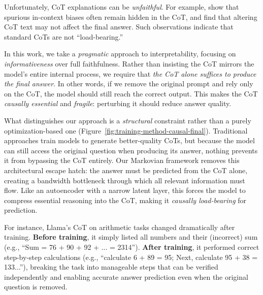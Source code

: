 \documentclass{article} %
\begin{document}
Unfortunately, CoT explanations can be \emph{unfaithful}. For example, \citet{turpin2023language} show that spurious in-context biases often remain hidden in the CoT, and \citet{lanham2023measuring} find that altering CoT text may not affect the final answer. Such observations indicate that standard CoTs are not ``load-bearing.''

In this work, we take a \emph{pragmatic} approach to interpretability, focusing on \emph{informativeness} over full faithfulness. Rather than insisting the CoT mirrors the model's entire internal process, we require that \emph{the CoT alone suffices to produce the final answer}. In other words, if we remove the original prompt and rely only on the CoT, the model should still reach the correct output. This makes the CoT \emph{causally essential} and \emph{fragile}: perturbing it should reduce answer quality.

What distinguishes our approach is a \emph{structural} constraint rather than a purely optimization-based one (Figure~\ref{fig:training-method-causal-final}). Traditional approaches train models to generate better-quality CoTs, but because the model can still access the original question when producing its answer, nothing prevents it from bypassing the CoT entirely. Our Markovian framework removes this architectural escape hatch: the answer must be predicted from the CoT alone, creating a bandwidth bottleneck through which all relevant information must flow. Like an autoencoder with a narrow latent layer, this forces the model to compress essential reasoning into the CoT, making it \emph{causally load-bearing} for prediction.

For instance, Llama's CoT on arithmetic tasks changed dramatically after training. \textbf{Before training}, it simply listed all numbers and their (incorrect) sum (e.g., ``Sum = 76 + 90 + 92 + ... = 2314''). \textbf{After training}, it performed correct step-by-step calculations (e.g., ``calculate 6 + 89 = 95; Next, calculate 95 + 38 = 133...''), breaking the task into manageable steps that can be verified independently and enabling accurate answer prediction even when the original question is removed.
\end{document}
